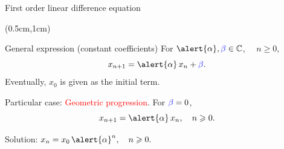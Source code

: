 \documentclass[10pt,t]{beamer}
\begin{document}
	
	\begin{frame}{First order linear difference equation}
	
	\transwipe
	
	\begin{textblock*}{12cm}(0.5cm,1cm)
	
	\begin{block}{General expression (constant coefficients)}
	For $\alert{\alpha}, \textcolor{blue}{\beta} \in \mathbb{C}$, $\quad n\geqslant 0$,
	\begin{equation*}
	x_{n+1} = \alert{\alpha} \, x_n + \textcolor{blue}{\beta}.
	\end{equation*}
	Eventually, $x_0$ is given as the initial term.
	\end{block}
	
	\end{textblock*}
	
	\vspace{3cm}
	
	
	Particular case: \textcolor{red}{Geometric progression}.  For $\textcolor{blue}{\beta} = 0$, 
	$$
	x_{n+1} = \alert{\alpha}\, x_n, \quad n\geqslant 0.
	$$
	
	\vspace{1cm}
	
	Solution: \quad $x_{n} = x_0 \, \alert{\alpha}^n, \quad n\geqslant 0.$
	
	
	\end{frame}
	
	
\end{document}
